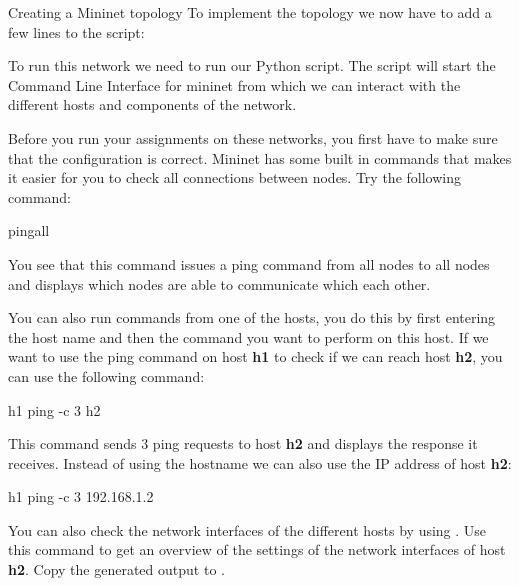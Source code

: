 \begin{exercise}{Creating a Mininet topology}
To implement the topology we now have to add a few lines to the  script:



To run this network we need to run our Python script. The script will start the Command Line Interface for mininet from which we can interact with the different hosts and components of the network.

Before you run your assignments on these networks, you first have to make sure that the configuration is correct. Mininet has some built in commands that makes it easier for you to check all connections between nodes. Try the following command:
\begin{cmdblock}[gobble=1]
	pingall
\end{cmdblock}
You see that this command issues a ping command from all nodes to all nodes and displays which nodes are able to communicate which each other.

You can also run commands from one of the hosts, you do this by first entering the host name and then the command you want to perform on this host. If we want to use the ping command on host \textbf{h1} to check if we can reach host \textbf{h2}, you can use the following command:
\begin{cmdblock}[gobble=1]
	h1 ping -c 3 h2
\end{cmdblock}
This command sends 3 ping requests to host \textbf{h2} and displays the response it receives. Instead of using the hostname we can also use the IP address of host \textbf{h2}:
\begin{cmdblock}[gobble=1]
	h1 ping -c 3 192.168.1.2
\end{cmdblock}

You can also check the network interfaces of the different hosts by using . Use this command to get an overview of the settings of the network interfaces of host \textbf{h2}. Copy the generated output to .
\end{exercise}

